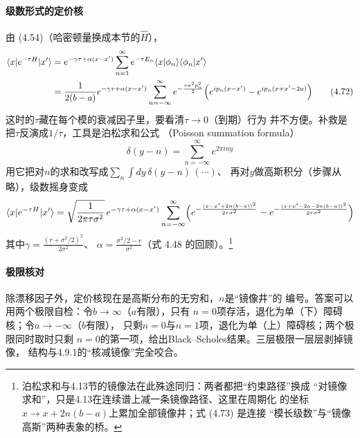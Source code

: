 \paragraph{级数形式的定价核}
由 (4.54)（哈密顿量换成本节的$\hat{H}$），
\begin{align*}
\langle x\vert e^{-\tau H}\vert x'\rangle
&=e^{-\gamma\tau+\alpha(x-x')}\sum_{n=1}^{\infty}e^{-\tau E_n}
\langle x\vert\phi_n\rangle\langle\phi_n\vert x'\rangle\\
&=\frac{1}{2(b-a)}e^{-\gamma\tau+\alpha(x-x')}\sum_{n=-\infty}^{\infty}
e^{-\frac{\tau\sigma^{2}p_n^{2}}{2}}
\Bigl(e^{ip_n(x-x')}-e^{ip_n(x+x'-2a)}\Bigr)
\tag{4.72}
\end{align*}
这时的$\tau$藏在每个模的衰减因子里，要看清$\tau\to0$（到期）行为
并不方便。补救是把$\tau$反演成$1/\tau$，工具是泊松求和公式
（Poisson summation formula）
\begin{equation*}
\delta(y-n)=\sum_{n=-\infty}^{\infty}e^{2\pi iny}
\tag{4.73}
\end{equation*}
用它把对$n$的求和改写成$\sum_n\int dy\,\delta(y-n)\,(\cdots)$、
再对$y$做高斯积分（步骤从略），级数摇身变成
\begin{equation*}
\langle x\vert e^{-\tau H}\vert x'\rangle=\sqrt{\frac{1}{2\pi\tau\sigma^{2}}}\,
e^{-\gamma\tau+\alpha(x-x')}\sum_{n=-\infty}^{\infty}
\Bigl(e^{-\frac{(x-x'+2n(b-a))^{2}}{2\tau\sigma^{2}}}
-e^{-\frac{(x+x'-2a-2n(b-a))^{2}}{2\tau\sigma^{2}}}\Bigr)
\end{equation*}
其中$\gamma=\frac{(r+\sigma^{2}/2)^{2}}{2\sigma^{2}}$、
$\alpha=\frac{\sigma^{2}/2-r}{\sigma^{2}}$（式 4.48 的回顾）。\footnote{
泊松求和与4.13节的镜像法在此殊途同归：两者都把“约束路径”换成
“对镜像求和”，只是4.13在连续谱上减一条镜像路径、这里在周期化
的坐标$x\to x+2n(b-a)$上累加全部镜像井；式 (4.73) 是连接
“模长级数”与“镜像高斯”两种表象的桥。}

\paragraph{极限核对}
除漂移因子外，定价核现在是高斯分布的无穷和，$n$是“镜像井”的
编号。答案可以用两个极限自检：令$b\to\infty$（$a$有限），只有
$n=0$项存活，退化为单（下）障碍核；令$a\to-\infty$（$b$有限），
只剩$n=0$与$n=1$项，退化为单（上）障碍核；两个极限同时取时只剩
$n=0$的第一项，给出Black--Scholes结果。三层极限一层层剥掉镜像，
结构与4.9.1的“核减镜像”完全咬合。

